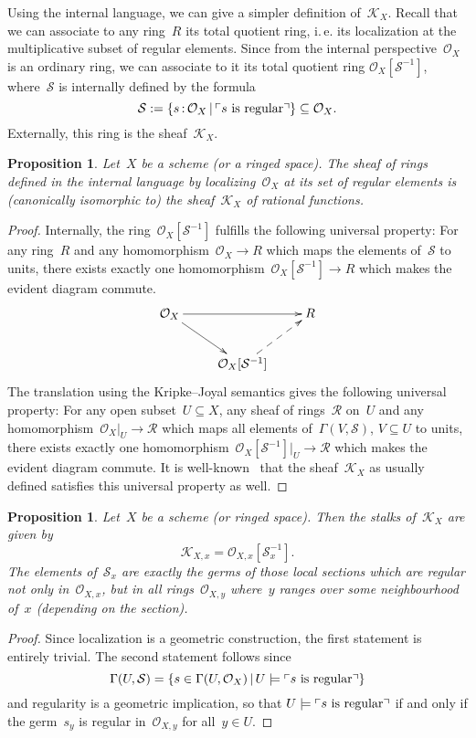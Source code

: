 \documentclass[10pt]{amsart}
\makeatletter
\theoremstyle{definition}
\theoremstyle{plain}
\newtheorem{prop}[defn]{Proposition}
\theoremstyle{remark}
\renewcommand{\O}{\mathcal{O}}
\newcommand{\K}{\mathcal{K}}
\newcommand{\R}{\mathcal{R}}
\renewcommand{\S}{\mathcal{S}}
\newcommand{\?}{\,{:}\,}
\renewcommand{\_}{\mathpunct{.}\,}
\newcommand{\speak}[1]{\ulcorner\text{\textnormal{#1}}\urcorner}
\newcommand{\ie}{i.\,e.\@\xspace}
\makeatother
\begin{document}
Using the internal language, we can give a simpler definition of~$\K_X$.
Recall that we can associate to any ring~$R$ its total quotient ring, \ie
its localization at the multiplicative subset of regular elements. Since from
the internal perspective~$\O_X$ is an ordinary ring, we can associate to it its
total quotient ring $\O_X[\S^{-1}]$,
where~$\S$ is internally defined by the formula
\[ \S := \{ s\?\O_X \,|\, \speak{$s$ is regular} \} \subseteq \O_X. \]
Externally, this ring is the sheaf~$\K_X$.
\begin{prop}Let~$X$ be a scheme (or a ringed space). The sheaf of rings defined
in the internal language by localizing~$\O_X$ at its set of regular elements is
(canonically isomorphic to) the sheaf~$\K_X$ of rational functions.
\end{prop}
\begin{proof}Internally, the ring~$\O_X[\S^{-1}]$ fulfills the following
universal property: For any ring~$R$ and any homomorphism~$\O_X \to R$ which
maps the elements of~$\S$ to units, there exists exactly one
homomorphism~$\O_X[\S^{-1}] \to R$ which makes the evident diagram commute.
\[ \xymatrix{
  \O_X \ar[rr] \ar[dr] && R \\
  & \O_X[\S^{-1}] \ar@{-->}[ru]
} \]
The translation using the Kripke--Joyal semantics gives the following universal
property: For any open subset~$U \subseteq X$, any sheaf of rings~$\R$ on~$U$ and any
homomorphism~$\O_X|_U \to \R$ which maps all elements of~$\Gamma(V,\S)$, $V
\subseteq U$ to units, there exists exactly one homomorphism~$\O_X[\S^{-1}]|_U \to
\R$ which makes the evident diagram commute.
It is well-known~\cite{???} that the sheaf~$\K_X$ as usually defined satisfies
this universal property as well.
\end{proof}

\begin{prop}\label{prop:stalks-kx}
Let~$X$ be a scheme (or ringed space). Then the stalks of~$\K_X$
are given by
\[ \K_{X,x} = \O_{X,x}[\S_x^{-1}]. \]
The elements of~$\S_x$ are exactly the germs of those local sections which are
regular not only in~$\O_{X,x}$, but in all rings~$\O_{X,y}$ where~$y$
ranges over some neighbourhood of~$x$ (depending on the section).\end{prop}
\begin{proof}
Since localization is a geometric construction, the first statement is entirely
trivial. The second statement follows since
\[ \Gamma(U,\S) = \{ s\in\Gamma(U,\O_X) \,|\, U \models \speak{$s$ is regular}
\} \]
and regularity is a geometric implication, so that
$U \models \speak{$s$ is regular}$ if and only if the germ~$s_y$ is regular
in~$\O_{X,y}$ for all~$y \in U$.
\end{proof}
\end{document}
